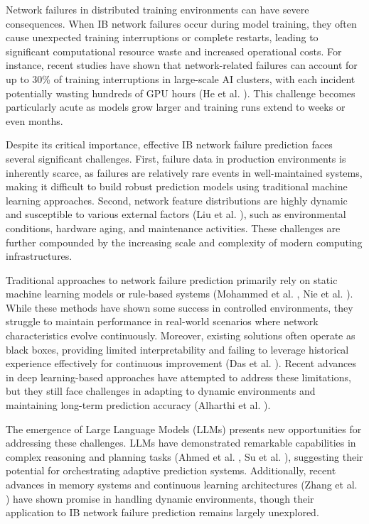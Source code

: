 \documentclass[conference]{IEEEtran}
\begin{document}
Network failures in distributed training environments can have severe consequences. When IB network failures occur during model training, they often cause unexpected training interruptions or complete restarts, leading to significant computational resource waste and increased operational costs. For instance, recent studies have shown that network-related failures can account for up to 30\% of training interruptions in large-scale AI clusters, with each incident potentially wasting hundreds of GPU hours (He et al. \cite{b6}). This challenge becomes particularly acute as models grow larger and training runs extend to weeks or even months.

Despite its critical importance, effective IB network failure prediction faces several significant challenges. First, failure data in production environments is inherently scarce, as failures are relatively rare events in well-maintained systems, making it difficult to build robust prediction models using traditional machine learning approaches. Second, network feature distributions are highly dynamic and susceptible to various external factors (Liu et al. \cite{b8}), such as environmental conditions, hardware aging, and maintenance activities. These challenges are further compounded by the increasing scale and complexity of modern computing infrastructures.

Traditional approaches to network failure prediction primarily rely on static machine learning models or rule-based systems (Mohammed et al. \cite{b9}, Nie et al. \cite{b10}). While these methods have shown some success in controlled environments, they struggle to maintain performance in real-world scenarios where network characteristics evolve continuously. Moreover, existing solutions often operate as black boxes, providing limited interpretability and failing to leverage historical experience effectively for continuous improvement (Das et al. \cite{b5}). Recent advances in deep learning-based approaches have attempted to address these limitations, but they still face challenges in adapting to dynamic environments and maintaining long-term prediction accuracy (Alharthi et al. \cite{b2}).

The emergence of Large Language Models (LLMs) presents new opportunities for addressing these challenges. LLMs have demonstrated remarkable capabilities in complex reasoning and planning tasks (Ahmed et al. \cite{b1}, Su et al. \cite{b12}), suggesting their potential for orchestrating adaptive prediction systems. Additionally, recent advances in memory systems and continuous learning architectures (Zhang et al. \cite{b13}) have shown promise in handling dynamic environments, though their application to IB network failure prediction remains largely unexplored.
\end{document}
